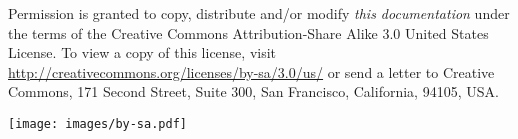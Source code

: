 \begin{License}

Permission is granted to copy, distribute and/or modify \emph{this documentation}
under the terms of the Creative Commons Attribution-Share Alike 3.0
United States License. To view a copy of this license, visit
\url{http://creativecommons.org/licenses/by-sa/3.0/us/} or send a
letter to Creative Commons, 171 Second Street, Suite 300, San Francisco, California,
94105, USA.

\medskip

\hfill \texttt{[image: images/by-sa.pdf]}
\end{License}
